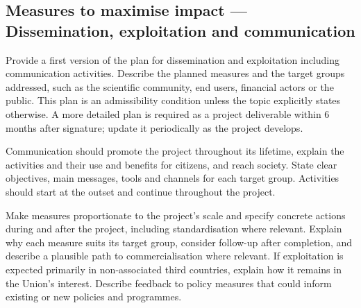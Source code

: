 

\subsection{Measures to maximise impact --- Dissemination, exploitation and
communication}
\label{sec:measures}
\begin{heguidance}
Provide a first version of the plan for dissemination and exploitation including
communication activities. Describe the planned measures and the target groups
addressed, such as the scientific community, end users, financial actors or the
public. This plan is an admissibility condition unless the topic explicitly
states otherwise. A more detailed plan is required as a project deliverable
within 6 months after signature; update it periodically as the project develops.

Communication should promote the project throughout its lifetime, explain the
activities and their use and benefits for citizens, and reach society. State
clear objectives, main messages, tools and channels for each target group.
Activities should start at the outset and continue throughout the project.

Make measures proportionate to the project's scale and specify concrete actions
during and after the project, including standardisation where relevant. Explain
why each measure suits its target group, consider follow-up after completion,
and describe a plausible path to commercialisation where relevant. If
exploitation is expected primarily in non-associated third countries, explain
how it remains in the Union's interest. Describe feedback to policy measures
that could inform existing or new policies and programmes.
\end{heguidance}


